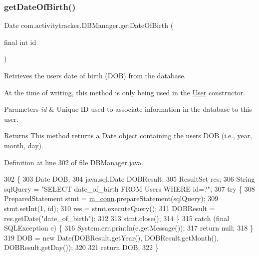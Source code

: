 \subsubsection{\texorpdfstring{get\+Date\+Of\+Birth()}{getDateOfBirth()}}
{\footnotesize\ttfamily Date com.\+activitytracker.\+D\+B\+Manager.\+get\+Date\+Of\+Birth (\begin{DoxyParamCaption}\item[{final int}]{id }\end{DoxyParamCaption})}

Retrieves the user\textquotesingle{}s date of birth (D\+OB) from the database.

At the time of writing, this method is only being used in the \mbox{\hyperlink{classcom_1_1activitytracker_1_1_user}{User}} constructor.


\begin{DoxyParams}{Parameters}
{\em id} & Unique ID used to associate information in the database to this user.\\
\hline
\end{DoxyParams}
\begin{DoxyReturn}{Returns}
This method returns a Date object containing the user\textquotesingle{}s D\+OB (i.\+e., year, month, day). 
\end{DoxyReturn}


Definition at line 302 of file D\+B\+Manager.\+java.


\begin{DoxyCode}
302                                              \{
303         Date DOB;
304         java.sql.Date DOBResult;
305         ResultSet res;
306         String sqlQuery = \textcolor{stringliteral}{"SELECT date\_of\_birth FROM Users WHERE id=?"};
307         \textcolor{keywordflow}{try} \{
308             PreparedStatement stmt = \mbox{\hyperlink{classcom_1_1activitytracker_1_1_d_b_manager_a064088d13ac09eb147fdc19268771521}{m\_conn}}.prepareStatement(sqlQuery);
309             stmt.setInt(1, \textcolor{keywordtype}{id});
310             res = stmt.executeQuery();
311             DOBResult = res.getDate(\textcolor{stringliteral}{"date\_of\_birth"});
312 
313             stmt.close();
314         \}
315         \textcolor{keywordflow}{catch} (\textcolor{keyword}{final} SQLException e) \{
316             System.err.println(e.getMessage());
317             \textcolor{keywordflow}{return} null;
318         \}
319         DOB = \textcolor{keyword}{new} Date(DOBResult.getYear(), DOBResult.getMonth(), DOBResult.getDay());
320 
321         \textcolor{keywordflow}{return} DOB;
322     \}
\end{DoxyCode}
\mbox{\label{classcom_1_1activitytracker_1_1_d_b_manager_a666452f1e5862f90c06b0beb9a9fcfdd}} 
